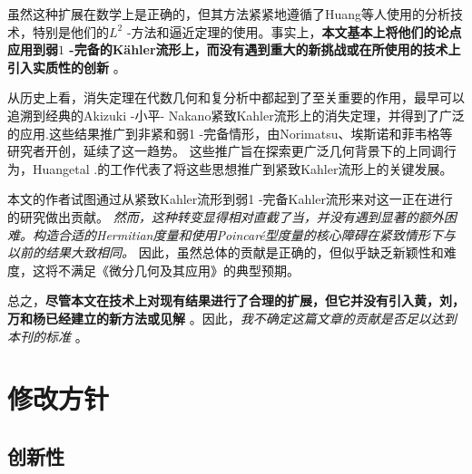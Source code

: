 \documentclass[lang=cn,zihao=-4,twoside,fontset=none]{textbook}
\begin{document}
虽然这种扩展在数学上是正确的，但其方法紧紧地遵循了Huang等人使用的分析技术，特别是他们的$L^2$ -方法和逼近定理的使用。事实上，\textbf{本文基本上将他们的论点应用到弱$1$ -完备的K\"ahler流形上，而没有遇到重大的新挑战或在所使用的技术上引入实质性的创新} 。


从历史上看，消失定理在代数几何和复分析中都起到了至关重要的作用，最早可以追溯到经典的Akizuki -小平- Nakano紧致Kahler流形上的消失定理，并得到了广泛的应用.这些结果推广到非紧和弱1 -完备情形，由Norimatsu、埃斯诺和菲韦格等研究者开创，延续了这一趋势。
这些推广旨在探索更广泛几何背景下的上同调行为，Huangetal .的工作代表了将这些思想推广到紧致Kahler流形上的关键发展。

\softclearmargin
本文的作者试图通过从紧致Kahler流形到弱1 -完备Kahler流形来对这一正在进行的研究做出贡献。
\textit{然而，这种转变显得相对直截了当，并没有遇到显著的额外困难。构造合适的Hermitian度量和使用Poincar\'e型度量的核心障碍在紧致情形下与以前的结果大致相同。}  因此，虽然总体的贡献是正确的，但似乎缺乏新颖性和难度，这将不满足《微分几何及其应用》的典型预期。


总之，\textbf{尽管本文在技术上对现有结果进行了合理的扩展，但它并没有引入黄，刘，万和杨已经建立的新方法或见解} 。因此，\textit{我不确定这篇文章的贡献是否足以达到本刊的标准} 。
\clearpage
\newpage
\section{修改方针}
\subsection{创新性}
\end{document}
